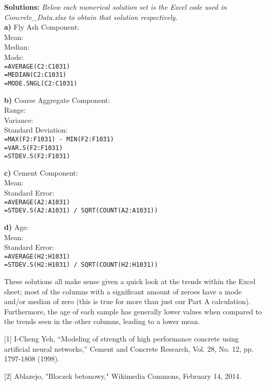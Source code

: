 \documentclass[letterpaper,11pt]{article}
\begin{document}
\textbf{Solutions:} \emph{Below each numerical solution set is the Excel code used in Concrete\_Data.xlsx to obtain that solution respectively.}\\
\textbf{a)} Fly Ash Component:\\
Mean: \\
Median: \\
Mode: \\
\texttt{=AVERAGE(C2:C1031)}\\
\texttt{=MEDIAN(C2:C1031)}\\
\texttt{=MODE.SNGL(C2:C1031)}

\textbf{b)} Coarse Aggregate Component:\\
Range: \\
Variance: \\
Standard Deviation: \\
\texttt{=MAX(F2:F1031) - MIN(F2:F1031)}\\
\texttt{=VAR.S(F2:F1031)}\\
\texttt{=STDEV.S(F2:F1031)}

\textbf{c)} Cement Component:\\
Mean: \\
Standard Error: \\
\texttt{=AVERAGE(A2:A1031)}\\
\texttt{=STDEV.S(A2:A1031) / SQRT(COUNT(A2:A1031))}

\textbf{d)} Age:\\
Mean: \\
Standard Error: \\
\texttt{=AVERAGE(H2:H1031)}\\
\texttt{=STDEV.S(H2:H1031) / SQRT(COUNT(H2:H1031))}

These solutions all make sense given a quick look at the trends within the Excel sheet; most of the columns with a significant amount of zeroes have a mode and/or median of zero (this is true for more than just our Part A calculation). Furthermore, the age of each sample has generally lower values when compared to the trends seen in the other columns, leading to a lower mean. 

[1] I-Cheng Yeh, “Modeling of strength of high performance concrete using artificial neural networks,”
Cement and Concrete Research, Vol. 28, No. 12, pp. 1797-1808 (1998).

[2] Ablazejo, "Bloczek betonowy," Wikimedia Commons, February 14, 2014.
\end{document}

